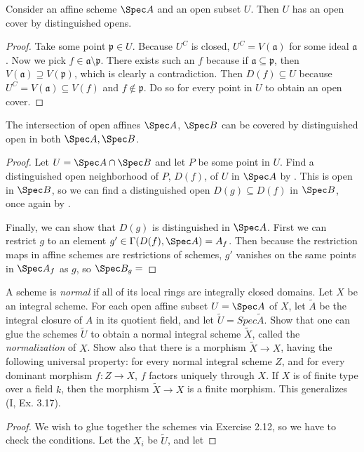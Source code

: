 \begin{lem}\label{lem:distinguished}
	Consider an affine scheme $\Spec A $ and an open subset $U $.
	Then $U $ has an open cover by distinguished opens.
\end{lem}
\begin{proof}
	Take some point $\mathfrak{p} \in U$.
	Because $U^C $ is closed, $U^C = V(\mathfrak{a}) $ for some ideal $\mathfrak{a} $.
	Now we pick $f \in \mathfrak{a} \setminus \mathfrak{p} $.
	There exists such an $f $ because if $\mathfrak{a} \subseteq \mathfrak{p} $, then $V(\mathfrak{a}) \supseteq V(\mathfrak{p})$, which is clearly a contradiction.
	Then $D(f) \subseteq U$ because $U^C = V(\mathfrak{a}) \subseteq V(f)$ and $f\notin \mathfrak{p} $.
	Do so for every point in $U $ to obtain an open cover.
\end{proof}

\begin{lem}
	The intersection of open affines $\Spec A $, $\Spec B $ can be covered by distinguished open in both $\Spec A, \Spec B $.
\end{lem}
\begin{proof}
	Let $U = \Spec A \cap \Spec B $ and let $P $ be some point in $U $.
	Find a distinguished open neighborhood of $P $, $D(f)$, of $U $ in $\Spec A $ by .
	This is open in $\Spec B $, so we can find a distinguished open $D(g) \subseteq D(f) $ in $\Spec B $, once again by .

	Finally, we can show that $D(g) $ is distinguished in $\Spec A $.
	First we can restrict $g $ to an element $g' \in \Gamma(D(f),\Spec A) = A_f $.
	Then because the restriction maps in affine schemes are restrictions of schemes, $g' $ vanishes on the same points in $\Spec A_f $ as $g $, so $\Spec B_g =  $
\end{proof}

\begin{exercise}[Normalization.] 
	A scheme is \textit{normal} if all of its local rings are integrally closed domains. Let $X$ be an integral scheme. For each open affine subset $U = \Spec A$ of $X$, let $\tilde{A} $ be the integral closure of $A$ in its quotient field, and let $\tilde{U} = Spec \tilde{A}$. Show that one can glue the schemes $\tilde{U}$ to obtain a normal integral scheme $\tilde{X} $, called the \textit{normalization} of $X$. Show also that there is a morphism $\tilde{X} \to X$, having the following universal property: for every normal integral scheme $Z$, and for every dominant morphism $f:Z \to X$, $f $ factors uniquely through $X$. If $X$ is of finite type over a field $k$, then the morphism $\tilde{X} \to X$ is a finite morphism. This generalizes (I, Ex. 3.17).
\end{exercise}
\begin{proof}
	We wish to glue together the schemes via Exercise 2.12, so we have to check the conditions.
	Let the $X_i $ be $\tilde{U} $, and let 
\end{proof}

